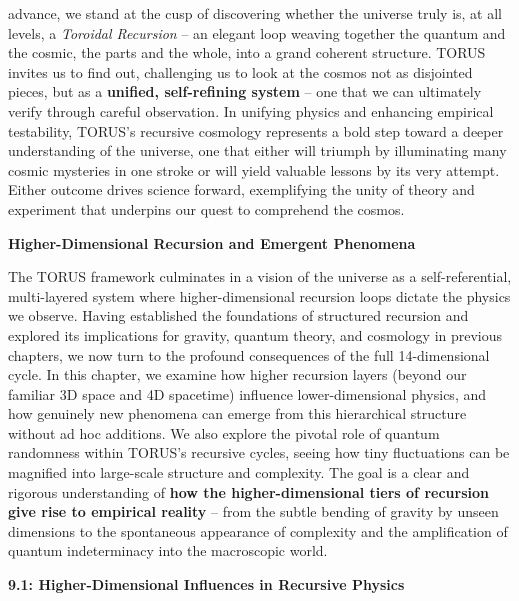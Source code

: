\documentclass[
]{article}
\begin{document}
advance, we stand at the cusp of discovering whether the universe truly
is, at all levels, a \emph{Toroidal Recursion} -- an elegant loop
weaving together the quantum and the cosmic, the parts and the whole,
into a grand coherent structure. TORUS invites us to find out,
challenging us to look at the cosmos not as disjointed pieces, but as a
\textbf{unified, self-refining system} -- one that we can ultimately
verify through careful observation\hspace{0pt}. In unifying physics and
enhancing empirical testability, TORUS's recursive cosmology represents
a bold step toward a deeper understanding of the universe, one that
either will triumph by illuminating many cosmic mysteries in one stroke
or will yield valuable lessons by its very attempt\hspace{0pt}. Either
outcome drives science forward, exemplifying the unity of theory and
experiment that underpins our quest to comprehend the cosmos.

\textbf{Higher-Dimensional Recursion and Emergent Phenomena}

The TORUS framework culminates in a vision of the universe as a
self-referential, multi-layered system where higher-dimensional
recursion loops dictate the physics we observe. Having established the
foundations of structured recursion and explored its implications for
gravity, quantum theory, and cosmology in previous chapters, we now turn
to the profound consequences of the full 14-dimensional cycle. In this
chapter, we examine how higher recursion layers (beyond our familiar 3D
space and 4D spacetime) influence lower-dimensional physics, and how
genuinely new phenomena can emerge from this hierarchical structure
without ad hoc additions. We also explore the pivotal role of quantum
randomness within TORUS's recursive cycles, seeing how tiny fluctuations
can be magnified into large-scale structure and complexity. The goal is
a clear and rigorous understanding of \textbf{how the higher-dimensional
tiers of recursion give rise to empirical reality} -- from the subtle
bending of gravity by unseen dimensions to the spontaneous appearance of
complexity and the amplification of quantum indeterminacy into the
macroscopic world.

\textbf{9.1: Higher-Dimensional Influences in Recursive Physics}
\end{document}
